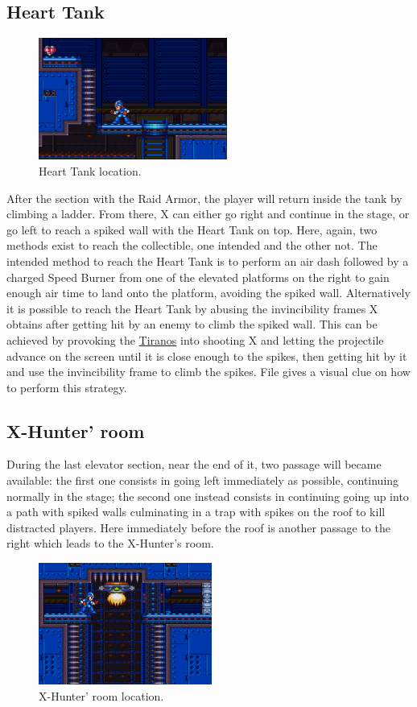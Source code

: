 \subsection{Heart Tank}
\begin{figure}[htp]
	\centering
	\includegraphics[height=4cm]{figures/X2/Wheel_gator/Gator_heart.png}
	\caption{Heart Tank location.}
\end{figure}
After the section with the Raid Armor, the player will return inside the tank by climbing a ladder. From there, X can either go right and continue in the stage, or go left to reach a spiked wall with the Heart Tank on top. Here, again, two methods exist to reach the collectible, one intended and the other not. The intended method to reach the Heart Tank is to perform an air dash followed by a charged Speed Burner from one of the elevated platforms on the right to gain enough air time to land onto the platform, avoiding the spiked wall. Alternatively it is possible to reach the Heart Tank by abusing the invincibility frames X obtains after getting hit by an enemy to climb the spiked wall. This can be achieved by provoking the \hyperlink {enem:Tiranos}{Tiranos} into shooting X and letting the projectile advance on the screen until it is close enough to the spikes, then getting hit by it and use the invincibility frame to climb the spikes. File  gives a visual clue on how to perform this strategy.


\subsection{X-Hunter' room}
During the last elevator section, near the end of it, two passage will became available: the first one consists in going left immediately as possible, continuing normally in the stage; the second one instead consists in continuing going up into a path with spiked walls culminating in a trap with spikes on the roof to kill distracted players. Here immediately before the roof is another passage to the right which leads to the X-Hunter's room.
\begin{figure}[htp]
	\centering
	\includegraphics[height=4cm]{figures/X2/Wheel_gator/Gator_Hunter_room.png}
	\caption{X-Hunter' room location.}
\end{figure}

